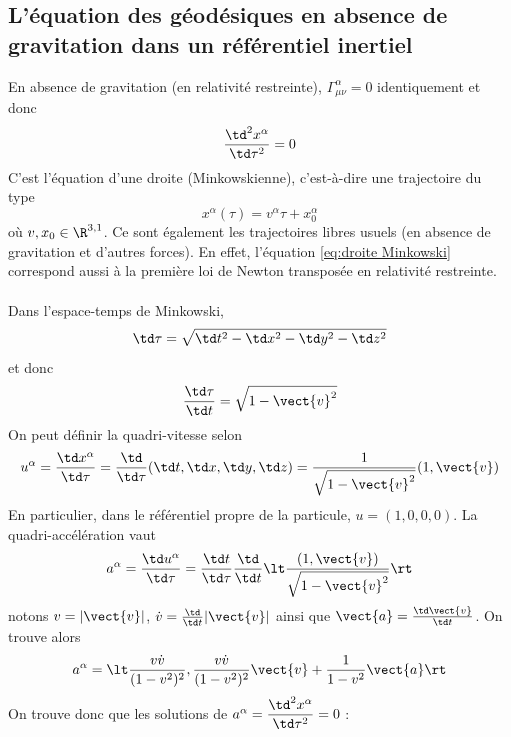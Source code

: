 \subsection{L'équation des géodésiques en absence de gravitation dans un référentiel inertiel}
En absence de gravitation (en relativité restreinte), $\Gamma^{\alpha}_{\mu \nu} = 0$ identiquement et donc
\begin{equation}
    \frac{\td^2x^{\alpha}}{\td\tau^2} = 0
    \label{eq:droite Minkowski}
\end{equation}
C'est l'équation d'une droite (Minkowskienne), c'est-à-dire une trajectoire du type
\begin{equation}
    x^\alpha (\tau) = v^\alpha \tau + x_0^\alpha
\end{equation}
où $v,x_0 \in \R^{3,1}$. Ce sont également les trajectoires libres usuels (en absence de gravitation et d'autres forces). En effet, l'équation \ref{eq:droite Minkowski} correspond aussi à la première loi de Newton transposée en relativité restreinte. \\
\\
Dans l'espace-temps de Minkowski, 
\begin{equation}
    \td \tau = \sqrt{\td t^2 - \td x^2 -\td y^2 - \td z^2}
\end{equation}
et donc 
\begin{equation}
    \frac{\td \tau}{\td t} = \sqrt{1- \vect{v}^2}
\end{equation}
On peut définir la quadri-vitesse selon
\begin{equation}
    u^\alpha = \frac{\td x^\alpha}{\td \tau} = \frac{\td}{\td \tau} (\td t,\td x,\td y,\td z) = \frac{1}{\sqrt{1-\vect{v}^2}} (1,\vect{v})
\end{equation}
En particulier, dans le référentiel propre de la particule, $u = (1,0,0,0)$. La quadri-accélération vaut
\begin{equation}
    a^\alpha = \frac{\td u^\alpha}{\td \tau} = \frac{\td t}{\td \tau}\frac{\td}{\td t} \lt \frac{(1,\vect{v})}{\sqrt{1-\vect{v}^2}} \rt
\end{equation}
notons $v=\lvert \vect{v} \rvert$, $\dot{v} = \frac{\td}{\td t} \lvert \vect{v} \rvert$ ainsi que $\vect{a} = \frac{\td \vect{v}}{\td t}$. On trouve alors
\begin{equation}
    a^\alpha = \lt \frac{v \dot{v}}{(1-v^2)^2}, \frac{v \dot{v}}{(1-v^2)^2} \vect{v} + \frac{1}{1-v^2} \vect{a}\rt
\end{equation}
On trouve donc que les solutions de $a^\alpha = \dfrac{\td^2 x^\alpha}{\td \tau^2} = 0$ :
